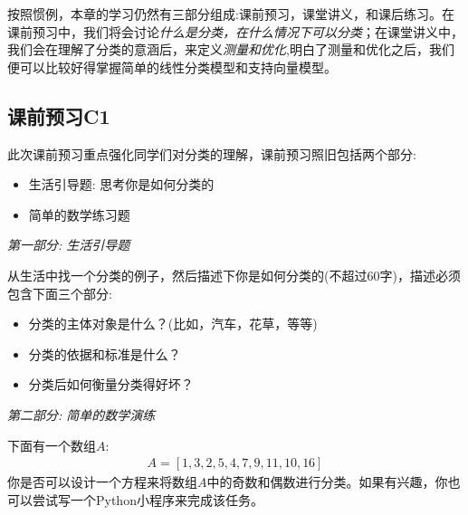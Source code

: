 \documentclass[12pt]{article}
\numberwithin{figure}{section}
\numberwithin{equation}{section}
\newenvironment{question}[2][Question]{\begin{trivlist}
\item[\hskip \labelsep {\bfseries #1}\hskip \labelsep {\bfseries #2.}]}{\end{trivlist}}
\begin{document}
按照惯例，本章的学习仍然有三部分组成:课前预习，课堂讲义，和课后练习。在课前预习中，我们将会讨论\textit{什么是分类，在什么情况下可以分类}；在课堂讲义中，我们会在理解了分类的意涵后，来定义\textit{测量和优化},明白了测量和优化之后，我们便可以比较好得掌握简单的线性分类模型和支持向量模型。


\subsection{课前预习C1}

此次课前预习重点强化同学们对分类的理解，课前预习照旧包括两个部分:
\begin{itemize}
	\item 生活引导题: 思考你是如何分类的
	\item 简单的数学练习题
\end{itemize}


\noindent
\textit{第一部分: 生活引导题}

从生活中找一个分类的例子，然后描述下你是如何分类的(不超过60字)，描述必须包含下面三个部分:
\begin{itemize}
	\item 分类的主体对象是什么？(比如，汽车，花草，等等)
	\item 分类的依据和标准是什么？
	\item 分类后如何衡量分类得好坏？
\end{itemize}


\noindent
\textit{第二部分: 简单的数学演练}

\begin{question}{C1-Q1}
	下面有一个数组$A$:
	\begin{align*}
		A  = [1, 3, 2, 5, 4, 7, 9, 11,  10, 16]
	\end{align*}
	你是否可以设计一个方程来将数组$A$中的奇数和偶数进行分类。如果有兴趣，你也可以尝试写一个Python小程序来完成该任务。
\end{question}
\end{document}
